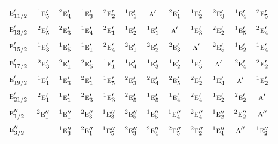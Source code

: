 \documentclass[10pt,a4paper]{article}
\numberwithin{equation}{section}
\newcommand{\irr}[1]{\text{\normalfont\scshape #1}}
\newcommand{\conjpair}[1]{{}^{#1}}
\begin{document}
{\begin{longtable}{@{}lccccccccccc@{}}
$\irr{e}_{11/2}'$ & $\conjpair{1}\irr{e}_{5}'$ & $\conjpair{2}\irr{e}_{4}'$ & $\conjpair{1}\irr{e}_{3}'$ & $\conjpair{2}\irr{e}_{2}'$ & $\conjpair{1}\irr{e}_{1}'$ & $\irr{a}'$ & $\conjpair{2}\irr{e}_{1}'$ & $\conjpair{1}\irr{e}_{2}'$ & $\conjpair{2}\irr{e}_{3}'$ & $\conjpair{1}\irr{e}_{4}'$ & $\conjpair{2}\irr{e}_{5}'$\\
$\irr{e}_{13/2}'$ & $\conjpair{2}\irr{e}_{5}'$ & $\conjpair{2}\irr{e}_{3}'$ & $\conjpair{1}\irr{e}_{4}'$ & $\conjpair{2}\irr{e}_{1}'$ & $\conjpair{1}\irr{e}_{2}'$ & $\conjpair{1}\irr{e}_{1}'$ & $\irr{a}'$ & $\conjpair{1}\irr{e}_{3}'$ & $\conjpair{2}\irr{e}_{2}'$ & $\conjpair{1}\irr{e}_{5}'$ & $\conjpair{2}\irr{e}_{4}'$\\
$\irr{e}_{15/2}'$ & $\conjpair{1}\irr{e}_{3}'$ & $\conjpair{1}\irr{e}_{5}'$ & $\conjpair{1}\irr{e}_{1}'$ & $\conjpair{2}\irr{e}_{4}'$ & $\conjpair{2}\irr{e}_{1}'$ & $\conjpair{2}\irr{e}_{2}'$ & $\conjpair{2}\irr{e}_{3}'$ & $\irr{a}'$ & $\conjpair{2}\irr{e}_{5}'$ & $\conjpair{1}\irr{e}_{2}'$ & $\conjpair{1}\irr{e}_{4}'$\\
$\irr{e}_{17/2}'$ & $\conjpair{2}\irr{e}_{3}'$ & $\conjpair{2}\irr{e}_{1}'$ & $\conjpair{2}\irr{e}_{5}'$ & $\conjpair{1}\irr{e}_{1}'$ & $\conjpair{1}\irr{e}_{4}'$ & $\conjpair{1}\irr{e}_{3}'$ & $\conjpair{1}\irr{e}_{2}'$ & $\conjpair{1}\irr{e}_{5}'$ & $\irr{a}'$ & $\conjpair{2}\irr{e}_{4}'$ & $\conjpair{2}\irr{e}_{2}'$\\
$\irr{e}_{19/2}'$ & $\conjpair{1}\irr{e}_{1}'$ & $\conjpair{1}\irr{e}_{3}'$ & $\conjpair{2}\irr{e}_{1}'$ & $\conjpair{1}\irr{e}_{5}'$ & $\conjpair{2}\irr{e}_{3}'$ & $\conjpair{2}\irr{e}_{4}'$ & $\conjpair{2}\irr{e}_{5}'$ & $\conjpair{2}\irr{e}_{2}'$ & $\conjpair{1}\irr{e}_{4}'$ & $\irr{a}'$ & $\conjpair{1}\irr{e}_{2}'$\\
$\irr{e}_{21/2}'$ & $\conjpair{2}\irr{e}_{1}'$ & $\conjpair{1}\irr{e}_{1}'$ & $\conjpair{2}\irr{e}_{3}'$ & $\conjpair{1}\irr{e}_{3}'$ & $\conjpair{2}\irr{e}_{5}'$ & $\conjpair{1}\irr{e}_{5}'$ & $\conjpair{1}\irr{e}_{4}'$ & $\conjpair{2}\irr{e}_{4}'$ & $\conjpair{1}\irr{e}_{2}'$ & $\conjpair{2}\irr{e}_{2}'$ & $\irr{a}'$\\
$\irr{e}_{1/2}''$ & $\conjpair{2}\irr{e}_{1}''$ & $\conjpair{1}\irr{e}_{1}''$ & $\conjpair{2}\irr{e}_{3}''$ & $\conjpair{1}\irr{e}_{3}''$ & $\conjpair{2}\irr{e}_{5}''$ & $\conjpair{1}\irr{e}_{5}''$ & $\conjpair{1}\irr{e}_{4}''$ & $\conjpair{2}\irr{e}_{4}''$ & $\conjpair{1}\irr{e}_{2}''$ & $\conjpair{2}\irr{e}_{2}''$ & $\irr{a}''$\\
$\irr{e}_{3/2}''$ &  & $\conjpair{1}\irr{e}_{3}''$ & $\conjpair{2}\irr{e}_{1}''$ & $\conjpair{1}\irr{e}_{5}''$ & $\conjpair{2}\irr{e}_{3}''$ & $\conjpair{2}\irr{e}_{4}''$ & $\conjpair{2}\irr{e}_{5}''$ & $\conjpair{2}\irr{e}_{2}''$ & $\conjpair{1}\irr{e}_{4}''$ & $\irr{a}''$ & $\conjpair{1}\irr{e}_{2}''$\\

\end{longtable}}
\end{document}

